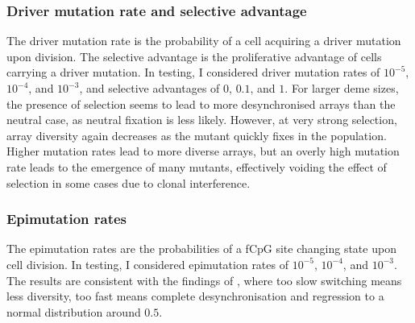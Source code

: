 \subsubsection{Driver mutation rate and selective advantage}
The driver mutation rate is the probability of a cell acquiring a driver
mutation upon division. The selective advantage is the proliferative advantage
of cells carrying a driver mutation. In testing, I considered driver mutation
rates of $10^{-5}$, $10^{-4}$, and $10^{-3}$, and selective advantages of $0$,
$0.1$, and $1$. For larger deme sizes, the presence of selection seems to lead
to more desynchronised arrays than the neutral case, as neutral fixation is
less likely. However, at very strong selection, array diversity again decreases
as the mutant quickly fixes in the population. Higher mutation rates lead to
more diverse arrays, but an overly high mutation rate leads to the emergence of
many mutants, effectively voiding the effect of selection in some cases due to
clonal interference.

\subsubsection{Epimutation rates}
The epimutation rates are the probabilities of a fCpG site changing state upon
cell division. In testing, I considered epimutation rates of $10^{-5}$,
$10^{-4}$, and $10^{-3}$. The results are consistent with the findings of
\cite{gabbutt_fluctuating_2022}, where too slow switching means less diversity,
too fast means complete desynchronisation and regression to a normal
distribution around $0.5$.

